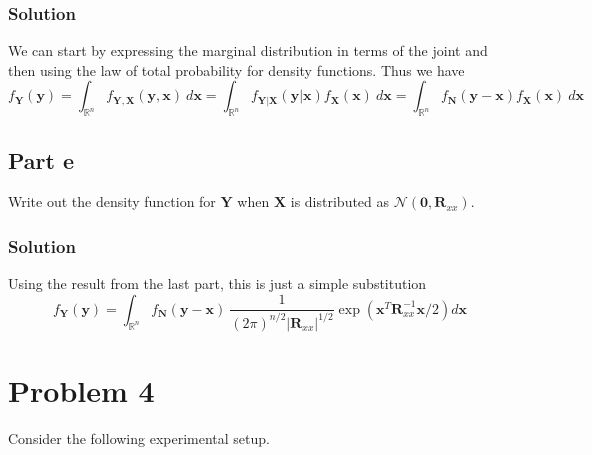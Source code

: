 \documentclass[a4paper]{article}
\begin{document}
\subsubsection*{Solution}%
We can start by expressing the marginal distribution in terms of the joint and then using the law of total probability for density functions. Thus we have
\[
  f_{\mathbf{Y}}(\mathbf{y}) = \int_{\mathds{R}^n} f_{\mathbf{Y}, \mathbf{X}}(\mathbf{y}, \mathbf{x})\ d\mathbf{x} = \int_{\mathds{R}^n} f_{\mathbf{Y}|\mathbf{X}}(\mathbf{y}|\mathbf{x})f_{\mathbf{X}}(\mathbf{x})\ d\mathbf{x} = \int_{\mathds{R}^n} f_{\mathbf{N}}(\mathbf{y} - \mathbf{x})f_{\mathbf{X}}(\mathbf{x})\ d\mathbf{x}
\]

\subsection*{Part e}%
Write out the density function for $\mathbf{Y}$ when $\mathbf{X}$ is distributed as $\mathcal{N}(\mathbf{0}, \mathbf{R}_{xx})$.

\subsubsection*{Solution}%
Using the result from the last part, this is just a simple substitution
\[
  f_{\mathbf{Y}}(\mathbf{y}) = \int_{\mathds{R}^n} f_{\mathbf{N}}(\mathbf{y} - \mathbf{x})\ \frac{1}{(2\pi)^{n/2}|\mathbf{R}_{xx}|^{1/2}} \exp\left(\mathbf{x}^T \mathbf{R}_{xx}^{-1}\mathbf{x}/2\right)d\mathbf{x}
\]

\section*{Problem 4}
Consider the following experimental setup.

\begin{figure}[H]
\begin{center}
\end{center}
\end{figure}
\end{document}
